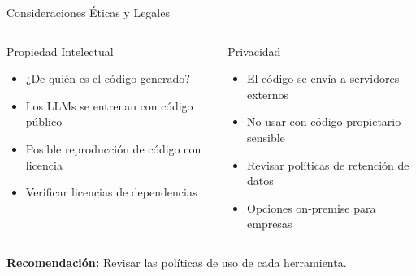 \documentclass[aspectratio=169]{beamer}
\begin{document}
\begin{frame}{Consideraciones Éticas y Legales}
    \begin{columns}[t]
        \begin{block}{Propiedad Intelectual}
            \begin{itemize}
                \item ¿De quién es el código generado?
                \item Los LLMs se entrenan con código público
                \item Posible reproducción de código con licencia
                \item Verificar licencias de dependencias
            \end{itemize}
        \end{block}
        
        \begin{block}{Privacidad}
            \begin{itemize}
                \item El código se envía a servidores externos
                \item No usar con código propietario sensible
                \item Revisar políticas de retención de datos
                \item Opciones on-premise para empresas
            \end{itemize}
        \end{block}
    \end{columns}
    
    \vspace{0.5cm}
    \centering
    \textbf{Recomendación:} Revisar las políticas de uso de cada herramienta.
\end{frame}
\end{document}
